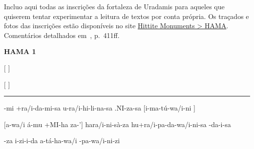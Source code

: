 
Incluo aqui todas as inscrições da fortaleza de Uradamis para aqueles que
quiserem tentar experimentar a leitura de textos por conta própria.
Os traçados e fotos das inscrições estão disponíveis no site
\href{https://www.hittitemonuments.com/hama/}{Hittite Monuments > HAMA}.
Comentários detalhados em~, p.\ 411ff.



\vspace{20pt}
\noindent \textbf{HAMA 1}
\vspace{10pt}

\begin{parnumbersa}[]
	\raggedright%

	\large {}\hspace{5pt}
	\hspace{5pt}
	\hspace{5pt}
	\hspace{5pt}
	$[$\hspace{5pt}
					 $]$


	\large $[$\hspace{5pt}
					\hspace{5pt}
					\hspace{5pt}
					$]$\hspace{5pt}
	\hspace{5pt}
	\hspace{5pt}

	\large {} \hspace{5pt}
	\hspace{5pt}
	\hspace{5pt}

\end{parnumbersa}

\vspace{10pt}
\hrule
\vspace{10pt}

\setcounter{parcount}{0}
\begin{parnumbersa}[]

	\raggedright%
	\itshape%

	-mi
	+ra/i-da-mi-sa
	u-ra/i-hi-li-na-sa
	.NI-za-sa
	$[$i-ma-tú-wa/i-ni
					$]$

	$[$a-wa/i á-mu +MI-ha za-'$]$ hara/i-ni-sà-za
	hu+ra/i-pa-da-wa/i-ni-sa -da-i-sa

	-za i-zi-i-da a-tá-ha-wa/i -pa-wa/i-ni-zi


\end{parnumbersa}

